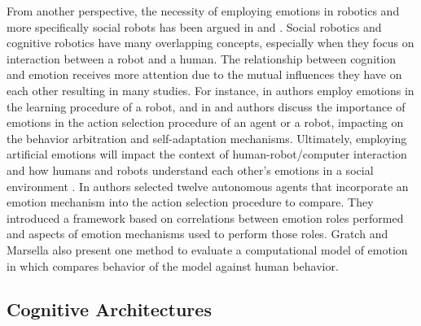 \documentclass[12pt]{report}
\begin{document}
From another perspective, the necessity of employing emotions in robotics and
more specifically social robots has been argued in
\cite{pfeifer:robotics-emotion} and \cite{sloman:robots-emotion}. Social
robotics and cognitive robotics have many overlapping concepts, especially when
they focus on interaction between a robot and a human. The relationship between
cognition and emotion receives more attention due to the mutual influences they
have on each other
\cite{morse:robotic-modelling-cognition,scheutz:emotional-states-behavior}
resulting in many studies. For instance, in \cite{gadanho:learning-emotions}
authors employ emotions in the learning procedure of a robot, and in
\cite{broekens:affect-action-selection} and
\cite{scheutz:emotion-action-behavior} authors discuss the importance of
emotions in the action selection procedure of an agent or a robot, impacting on
the behavior arbitration and self-adaptation mechanisms. Ultimately, employing
artificial emotions will impact the context of human-robot/computer interaction
\cite{hudlicka:affect-HRI} and how humans and robots understand each other's
emotions in a social environment
\cite{kirby:social-robots,canamero:emotion-robot-perspective}. In
\cite{rumbell:comparative-emotions-functions} authors selected twelve autonomous
agents that incorporate an emotion mechanism into the action selection procedure
to compare. They introduced a framework based on correlations between emotion
roles performed and aspects of emotion mechanisms used to perform those roles.
Gratch and Marsella also present one method to evaluate a computational model of
emotion in \cite{gratch:evaluating} which compares behavior of the model against
human behavior.

\subsection{Cognitive Architectures}
\end{document}
